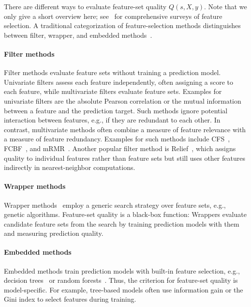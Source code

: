 \documentclass{article}
\theoremstyle{definition}
\begin{document}
There are different ways to evaluate feature-set quality $Q(s,X,y)$.
Note that we only give a short overview here; see~\cite{chandrashekar2014survey,li2017feature} for comprehensive surveys of feature selection.
A traditional categorization of feature-selection methods distinguishes between filter, wrapper, and embedded methods~\cite{guyon2003introduction}.

\paragraph{Filter methods}

Filter methods evaluate feature sets without training a prediction model.
Univariate filters assess each feature independently, often assigning a score to each feature, while multivariate filters evaluate feature sets.
Examples for univariate filters are the absolute Pearson correlation or the mutual information between a feature and the prediction target.
Such methods ignore potential interaction between features, e.g., if they are redundant to each other.
In contrast, multivariate methods often combine a measure of feature relevance with a measure of feature redundancy.
Examples for such methods include CFS~\cite{hall1999correlation, hall2000correlation}, FCBF~\cite{yu2003feature}, and mRMR~\cite{peng2005feature}.
Another popular filter method is Relief~\cite{kira1992feature, robnik1997adaptation}, which assigns quality to individual features rather than feature sets but still uses other features indirectly in nearest-neighbor computations.

\paragraph{Wrapper methods}

Wrapper methods~\cite{kohavi1997wrappers} employ a generic search strategy over feature sets, e.g., genetic algorithms.
Feature-set quality is a black-box function:
Wrappers evaluate candidate feature sets from the search by training prediction models with them and measuring prediction quality.

\paragraph{Embedded methods}

Embedded methods train prediction models with built-in feature selection, e.g., decision trees~\cite{breiman1984classification} or random forests~\cite{breiman2001random}.
Thus, the criterion for feature-set quality is model-specific.
For example, tree-based models often use information gain or the Gini index to select features during training.
\end{document}
